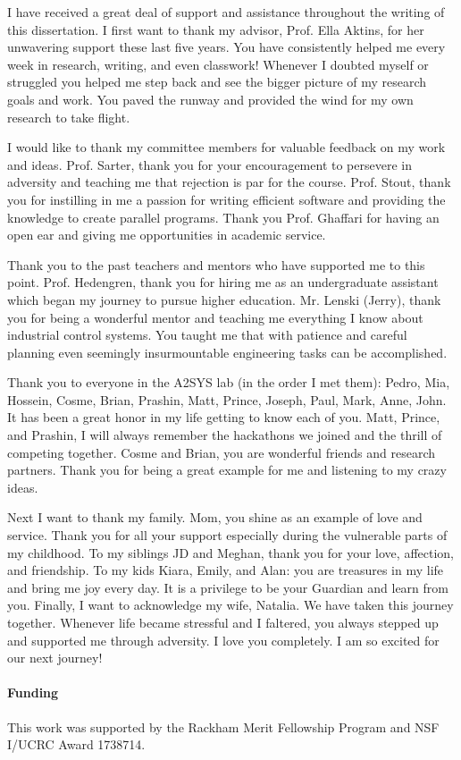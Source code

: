 I have received a great deal of support and assistance throughout the writing of this dissertation. I first want to thank my advisor, Prof. Ella Aktins, for her unwavering support these last five years. You have consistently helped me every week in research, writing, and even classwork! Whenever I doubted myself or struggled you helped me step back and see the bigger picture of my research goals and work. You paved the runway and provided the wind for my own research to take flight.

I would like to thank my committee members for valuable feedback on my work and ideas. Prof. Sarter, thank you for your encouragement to persevere in adversity and teaching me that rejection is par for the course. Prof. Stout, thank you for instilling in me a passion for writing efficient software and providing the knowledge to create parallel programs. Thank you Prof. Ghaffari for having an open ear and giving me opportunities in academic service.


Thank you to the past teachers and mentors who have supported me to this point. Prof. Hedengren, thank you for hiring me as an undergraduate assistant which began my journey to pursue higher education. Mr. Lenski (Jerry), thank you for being a wonderful mentor and teaching me everything I know about industrial control systems. You taught me that with patience and careful planning even seemingly insurmountable engineering tasks can be accomplished. 

Thank you to everyone in the A2SYS lab (in the order I met them): Pedro, Mia, Hossein, Cosme, Brian, Prashin, Matt, Prince, Joseph, Paul, Mark, Anne, John.  It has been a great honor in my life getting to know each of you. Matt, Prince, and Prashin, I will always remember the hackathons we joined and the thrill of competing together. Cosme and Brian, you are wonderful friends and research partners. Thank you for being a great example for me and listening to my crazy ideas.

Next I want to thank my family. Mom, you shine as an example of love and service. Thank you for all your support especially during the vulnerable parts of my childhood. To my siblings JD and Meghan, thank you for your love, affection, and friendship. To my kids Kiara, Emily, and Alan: you are treasures in my life and bring me joy every day. It is a privilege to be your Guardian and learn from you.  Finally, I want to acknowledge my wife, Natalia. We have taken this journey together. Whenever life became stressful and I faltered, you always stepped up and supported me through adversity. I love you completely. I am so excited for our next journey!  


\paragraph{Funding}
This work was supported by the Rackham Merit Fellowship Program and NSF I/UCRC Award 1738714. 

